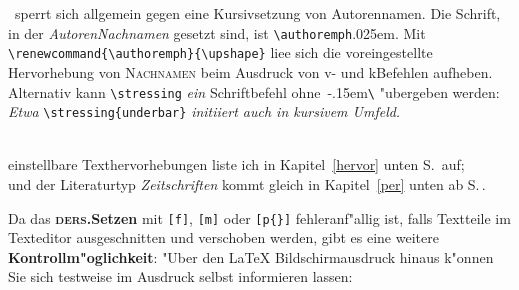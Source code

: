 \documentclass[12pt,a4paper]{article}
\begin{document}
\vspace{1.25ex}\noindent
\BibArts\ sperrt sich allgemein gegen eine Kursivsetzung von Autorennamen.
Die Schrift, in der \textit{Autoren\hy Nachnamen} gesetzt sind, ist \verb|\authoremph|\kern.025em.
Mit \verb|\renewcommand{\authoremph}{\upshape}| \hspace{.1em}lie\hyss e sich die voreingestellte
Hervorhebung von \textsc{Nachnamen} beim Ausdruck von v- und k\fhy Befehlen 
aufheben. Alternativ kann \verb|\stressing| \textit{ein} Schriftbefehl
ohne~\kern-.15em\verb|\| "ubergeben werden: \textit{Etwa} \verb|\stressing{underbar}| 
\textit{initiiert 
{\itshape\notprinthints{}} auch
in kursivem Umfeld.}

\vfill{}
\\[.25ex]{\sffamily 
einstellbare Texthervorhebungen liste ich in Kapitel~\ref{hervor} 
unten S.\,\pageref{hervor} auf;}
\\[.25ex]{\sffamily 
und der Literaturtyp \textit{Zeitschriften} kommt gleich in 
Kapitel~\ref{per} unten ab S.\,\pageref{per}.}%


\newpage 
Da das \textbf{\textsc{ders.}\hy Setzen} mit \verb|[f]|, \verb|[m]| 
oder \verb|[p{}]| fehleranf"allig ist, falls Textteile im 
Texteditor ausgeschnitten und verschoben werden, gibt es 
eine weitere \textbf{Kontrollm"oglichkeit}: "Uber den \LaTeX\hy 
Bildschirmausdruck hinaus  k"onnen Sie sich testweise 
im Ausdruck selbst informieren lassen:
\end{document}
